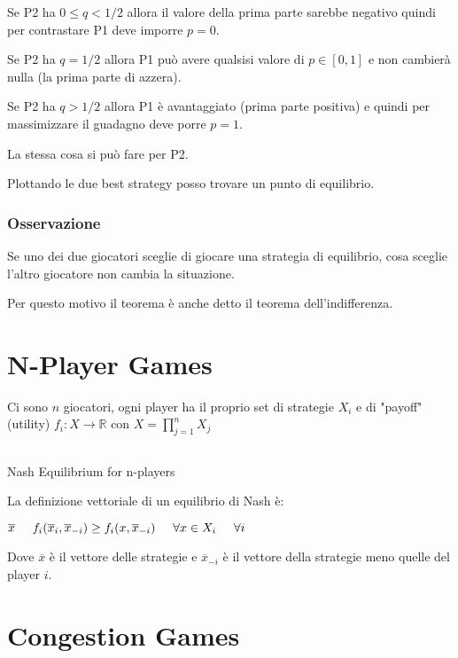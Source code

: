 \documentclass[10pt,a4paper]{report}
\begin{document}
        Se P2 ha $0 \le q < 1/2$ allora il valore della prima parte sarebbe negativo quindi per contrastare P1 deve imporre $p=0$.

        Se P2 ha $q = 1/2$ allora P1 può avere qualsisi valore di $p \in [0,1]$ e non cambierà nulla (la prima parte di azzera).

        Se P2 ha $q > 1/2$ allora P1 è avantaggiato (prima parte positiva) e quindi per massimizzare il guadagno deve porre $p=1$.

        La stessa cosa si può fare per P2.

        Plottando le due best strategy posso trovare un punto di equilibrio.

        \subsubsection{Osservazione}
        Se uno dei due giocatori sceglie di giocare una strategia di equilibrio, cosa sceglie l'altro giocatore non cambia la situazione.

        Per questo motivo il teorema è anche detto il teorema dell'indifferenza.

        \section{N-Player Games}
        Ci sono $n$ giocatori, ogni player ha il proprio set di strategie $X_i$ e di "payoff" (utility) $f_i: X \rightarrow \mathbb{R}$ con $X = \prod_{j=1}^nX_j$

        \subsection{}{Nash Equilibrium for n-players}

        La definizione vettoriale di un equilibrio di Nash è:

        $\overline{x} \hspace{.5cm} f_i(\overline{x}_i, \overline{x}_{-i}) \ge f_i(x, \overline{x}_{-i}) \hspace{.5cm} \forall x  \in X_i \hspace{.5cm} \forall i$

        Dove $\overline{x}$ è il vettore delle strategie e $\overline{x}_{-i}$ è il vettore della strategie meno quelle del player $i$.


        \section{Congestion Games}
\end{document}
